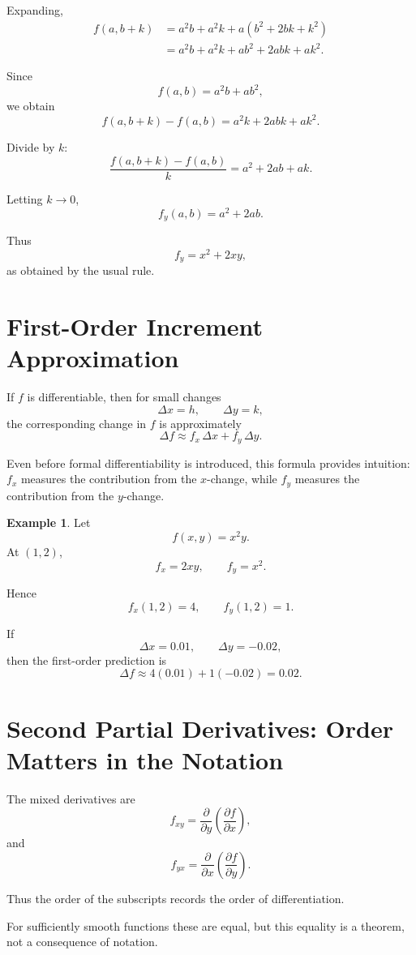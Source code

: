 \documentclass[11pt,oneside]{book}
\theoremstyle{studentthm}
\theoremstyle{definition}
\newtheorem{example}[theorem]{Example}
\begin{document}
Expanding,
\[
\begin{aligned}
f(a,b+k)
&=
a^2b+a^2k+a(b^2+2bk+k^2)\\
&=
a^2b+a^2k+ab^2+2abk+ak^2.
\end{aligned}
\]

Since
\[
f(a,b)=a^2b+ab^2,
\]
we obtain
\[
f(a,b+k)-f(a,b)
=
a^2k+2abk+ak^2.
\]

Divide by \(k\):
\[
\frac{
f(a,b+k)-f(a,b)
}{k}
=
a^2+2ab+ak.
\]

Letting \(k\to0\),
\[
f_y(a,b)=a^2+2ab.
\]

Thus
\[
f_y=x^2+2xy,
\]
as obtained by the usual rule.

\section{First-Order Increment Approximation}

If \(f\) is differentiable, then for small changes
\[
\Delta x=h,\qquad \Delta y=k,
\]
the corresponding change in \(f\) is approximately
\[
\Delta f
\approx
f_x\,\Delta x+f_y\,\Delta y.
\]

Even before formal differentiability is introduced, this formula
provides intuition: \(f_x\) measures the contribution from the
\(x\)-change, while \(f_y\) measures the contribution from the
\(y\)-change.

\begin{example}
Let
\[
f(x,y)=x^2y.
\]
At \((1,2)\),
\[
f_x=2xy,
\qquad
f_y=x^2.
\]

Hence
\[
f_x(1,2)=4,
\qquad
f_y(1,2)=1.
\]

If
\[
\Delta x=0.01,\qquad
\Delta y=-0.02,
\]
then the first-order prediction is
\[
\Delta f
\approx
4(0.01)+1(-0.02)
=
0.02.
\]
\end{example}

\section{Second Partial Derivatives: Order Matters in the Notation}

The mixed derivatives are
\[
f_{xy}
=
\frac{\partial}{\partial y}
\left(
\frac{\partial f}{\partial x}
\right),
\]
and
\[
f_{yx}
=
\frac{\partial}{\partial x}
\left(
\frac{\partial f}{\partial y}
\right).
\]

Thus the order of the subscripts records the order of differentiation.

For sufficiently smooth functions these are equal, but this equality
is a theorem, not a consequence of notation.
\end{document}

